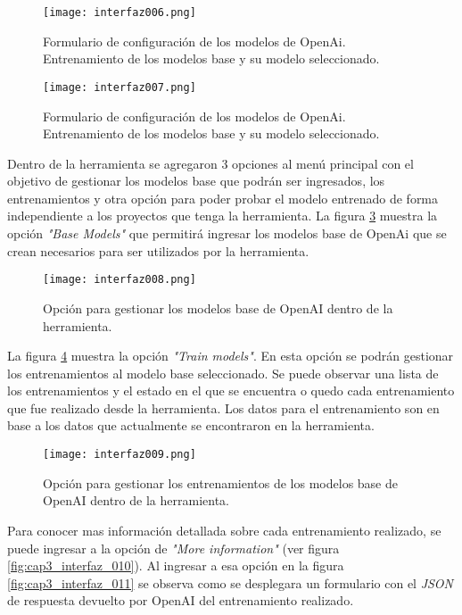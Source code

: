 \begin{figure}[H]  
 	\centering
 	\texttt{[image: interfaz006.png]} 
 	\caption{Formulario de configuración de los modelos de OpenAi. Entrenamiento de los modelos base y su modelo seleccionado.}
 	\label{fig:cap3_interfaz_006}
\end{figure}

\begin{figure}[H]  
	\centering
	\texttt{[image: interfaz007.png]} 
	\caption{Formulario de configuración de los modelos de OpenAi. Entrenamiento de los modelos base y su modelo seleccionado.}
	\label{fig:cap3_interfaz_007}
\end{figure}

Dentro de la herramienta se agregaron 3 opciones al menú principal con el objetivo de gestionar los modelos base que podrán ser ingresados, los entrenamientos y otra opción para poder probar el modelo entrenado de forma independiente a los proyectos que tenga la herramienta. La figura \ref{fig:cap3_interfaz_008} muestra la opción \textit{"Base Models"} que permitirá ingresar los modelos base de OpenAi que se crean necesarios para ser utilizados por la herramienta.

\begin{figure}[H]  
	\centering
	\texttt{[image: interfaz008.png]} 
	\caption{Opción para gestionar los modelos base de OpenAI dentro de la herramienta.}
	\label{fig:cap3_interfaz_008}
\end{figure}

La figura \ref{fig:cap3_interfaz_009} muestra la opción \textit{"Train models"}. En esta opción se podrán gestionar los entrenamientos al modelo base seleccionado. Se puede observar una lista de los entrenamientos y el estado en el que se encuentra o quedo cada entrenamiento que fue realizado desde la herramienta. Los datos para el entrenamiento son en base a los datos que actualmente se encontraron en la herramienta.  

\begin{figure}[H]  
	\centering
	\texttt{[image: interfaz009.png]} 
	\caption{Opción para gestionar los entrenamientos de los modelos base de OpenAI dentro de la herramienta.}
	\label{fig:cap3_interfaz_009}
\end{figure} 

Para conocer mas información detallada sobre cada entrenamiento realizado, se puede ingresar a la opción de \textit{"More information"} (ver figura \ref{fig:cap3_interfaz_010}). Al ingresar a esa opción en la figura \ref{fig:cap3_interfaz_011} se observa  como se desplegara un formulario con el \textit{JSON} de respuesta devuelto por OpenAI del entrenamiento realizado. 

